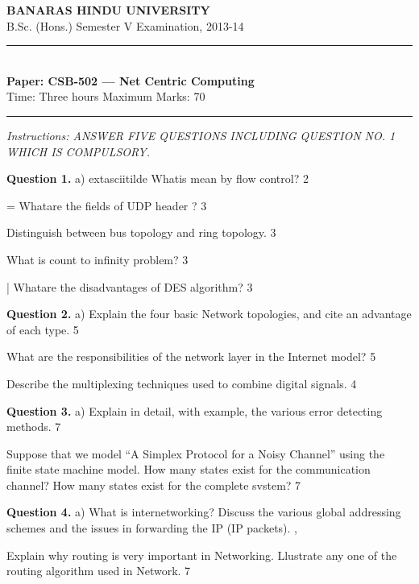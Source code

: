 \documentclass[11pt,a4paper]{article}
\begin{document}
\begin{center}
  {\large\bfseries BANARAS HINDU UNIVERSITY}\\[2pt]
  {\normalsize B.Sc. (Hons.) Semester V Examination, 2013-14}\\[6pt]
  \rule{0.8\linewidth}{0.5pt}\\[6pt]
  {\large\bfseries Paper: CSB-502 --- Net Centric Computing}\\[4pt]
  {\normalsize Time: Three hours \hfill Maximum Marks: 70}
\end{center}

\rule{\linewidth}{0.4pt}

\smallskip
\noindent\textit{Instructions: ANSWER FIVE QUESTIONS INCLUDING QUESTION NO. 1 WHICH IS COMPULSORY.}

\bigskip

\medskip\noindent\textbf{Question 1.} a) 	extasciitilde{} Whatis mean by flow control? 2
\begin{parts}
  \item = Whatare the fields of UDP header ? 3
  \item Distinguish between bus topology and ring topology. 3
  \item What is count to infinity problem? 3
  \item | Whatare the disadvantages of DES algorithm? 3
\end{parts}

\medskip\noindent\textbf{Question 2.} a) Explain the four basic Network topologies, and cite an advantage of each type. 5
\begin{parts}
  \item What are the responsibilities of the network layer in the Internet model? 5
  \item Describe the multiplexing techniques used to combine digital signals. 4
\end{parts}

\medskip\noindent\textbf{Question 3.} a) Explain in detail, with example, the various error detecting methods. 7
\begin{parts}
  \item Suppose that we model “A Simplex Protocol for a Noisy Channel” using the finite state
  machine model. How many states exist for the communication channel? How many states
  exist for the complete svstem? 7
\end{parts}

\medskip\noindent\textbf{Question 4.} a) What is internetworking? Discuss the various global addressing schemes and the issues in
forwarding the IP (IP packets). ,
\begin{parts}
  \item Explain why routing is very important in Networking. Llustrate any one of the routing
  algorithm used in Network. 7
\end{parts}
\end{document}
